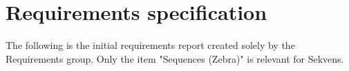 \chapter{Requirements specification}\label{app:reqgroup1}

The following is the initial requirements report created solely by the Requirements group. Only the item "Sequences (Zebra)" is relevant for Sekvens.


